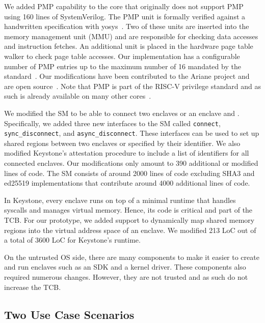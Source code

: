 We added PMP capability to the core that originally does not support PMP using 160 lines of SystemVerilog. The PMP unit is formally verified against a handwritten specification with yosys~\cite{wolf2016yosys}. Two of these units are inserted into the memory management unit (MMU) and are responsible for checking data accesses and instruction fetches. An additional unit is placed in the hardware page table walker to check page table accesses.
Our implementation has a configurable number of PMP entries up to the maximum number of 16 mandated by the standard~\cite{riscv2019privspec}. Our modifications have been contributed to the Ariane project and are open source~\cite{arianegithub}. Note that PMP is part of the RISC-V privilege standard and as such is already available on many other cores~\cite{asanovic2016rocket,ibex}. 

We modified the SM to be able to connect two enclaves or an enclave and \sphw. Specifically, we added three new interfaces to the SM called \texttt{connect}, \texttt{sync\_disconnect}, and \texttt{async\_disconnect}. These interfaces can be used to set up shared regions between two enclaves or \sphw specified by their identifier. We also modified Keystone's attestation procedure to include a list of identifiers for all connected enclaves. Our modifications only amount to 390 additional or modified lines of code. The SM consists of around 2000 lines of code excluding SHA3 and ed25519 implementations that contribute around 4000 additional lines of code. %

In Keystone, every enclave runs on top of a minimal runtime that handles syscalls and manages virtual memory. Hence, its code is critical and part of the TCB. For our prototype, we added support to dynamically map shared memory regions into the virtual address space of an enclave. We modified 213 LoC out of a total of 3600 LoC for Keystone's runtime.

On the untrusted OS side, there are many components to make it easier to create and run enclaves such as an SDK and a kernel driver. These components also required numerous changes. However, they are not trusted and as such do not increase the TCB. 

\subsection{Two Use Case Scenarios}

